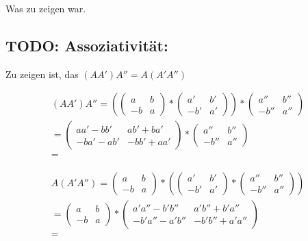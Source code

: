 \documentclass{article}
\begin{document}
Was zu zeigen war.

\subsection*{TODO: Assoziativität:}

Zu zeigen ist, das
\((AA')A''=A(A'A'')\)


\[
\begin{split}
(AA')A''
=
\left (
\begin{pmatrix}
  a & b \\
  -b & a
\end{pmatrix}
*
\begin{pmatrix}
  a' & b' \\
  -b' & a'
\end{pmatrix}
\right )
*
\begin{pmatrix}
  a'' & b'' \\
  -b'' & a''
\end{pmatrix}
\\
=
\begin{pmatrix}
  aa'-bb'    & ab' + ba' \\
  -ba' - ab' & -bb' + aa'
\end{pmatrix}
*
\begin{pmatrix}
  a'' & b'' \\
  -b'' & a''
\end{pmatrix}
\\
=
\end{split}
\]


\[
\begin{split}
A(A'A'')
=
\begin{pmatrix}
  a & b \\
  -b & a
\end{pmatrix}
*
\left (
\begin{pmatrix}
  a' & b' \\
  -b' & a'
\end{pmatrix}
*
\begin{pmatrix}
  a'' & b'' \\
  -b'' & a''
\end{pmatrix}
\right )
\\
=
\begin{pmatrix}
  a & b \\
  -b & a
\end{pmatrix}
*
\begin{pmatrix}
  a'a''-b'b'' & a'b'' + b'a'' \\
  -b'a'' - a'b'' & -b'b'' + a'a''
\end{pmatrix}
\\
=
\end{split}
\]
\end{document}

